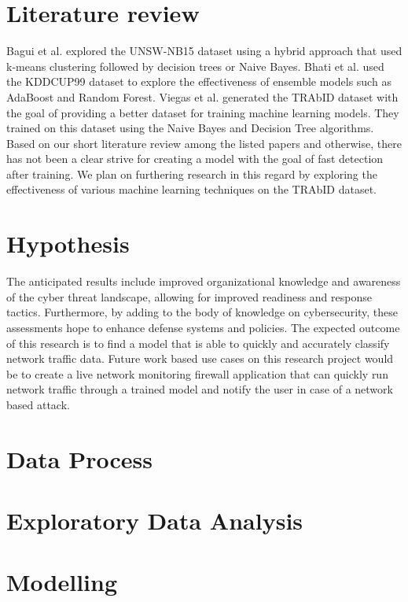 \section{Literature review}
Bagui et al. \cite{bagui2019using} explored the UNSW-NB15 dataset \cite{moustafa2015unsw} using a hybrid approach that used k-means clustering followed by decision trees or Naive Bayes. Bhati et al. \cite{bhati2022ensemble} used the KDDCUP99 dataset to explore the effectiveness of ensemble models such as AdaBoost and Random Forest. Viegas et al. \cite{viegas2017toward} generated the TRAbID dataset with the goal of providing a better dataset for training machine learning models. They trained on this dataset using the Naive Bayes and Decision Tree algorithms. Based on our short literature review among the listed papers and otherwise, there has not been a clear strive for creating a model with the goal of fast detection after training. We plan on furthering research in this regard by exploring the effectiveness of various machine learning techniques on the TRAbID dataset.

\section{Hypothesis}
The anticipated results include improved organizational knowledge and awareness of the cyber threat landscape, allowing for improved readiness and response tactics. Furthermore, by adding to the body of knowledge on cybersecurity, these assessments hope to enhance defense systems and policies. The expected outcome of this research is to find a model that is able to quickly and accurately classify network traffic data. Future work based use cases on this research project would be to create a live network monitoring firewall application that can quickly run network traffic through a trained model and notify the user in case of a network based attack.

\section{Data Process}

\section{Exploratory Data Analysis}

\section{Modelling}
